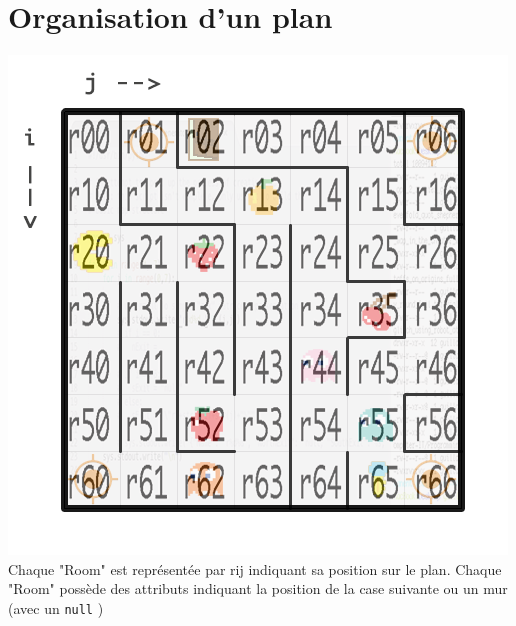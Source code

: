 \documentclass[twoside,french]{article}
\begin{document}
\section{Organisation d'un plan}
   \includegraphics[scale=0.4]{graphics/Plan-Projet-1_numbered.png} \\
   Chaque "Room" est représentée par rij indiquant sa position sur le plan.
   Chaque "Room" possède des attributs indiquant la position de la case suivante ou un mur (avec un \lstinline|null| )
\end{document}
